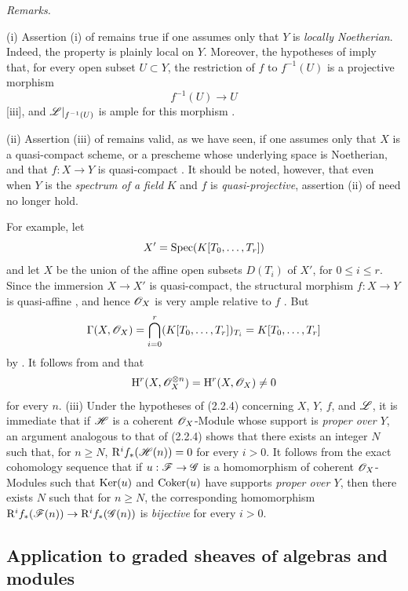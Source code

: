 \begin{env}[2.2.5]
\label{III.2.2.5}
\emph{Remarks.}

(i) Assertion (i) of  remains true if one assumes only that $Y$ is \emph{locally Noetherian}.
Indeed, the property is plainly local on $Y$.
Moreover, the hypotheses of  imply that, for every open subset $U\subset Y$, the restriction of $f$ to $f^{-1}(U)$ is a projective morphism
\[
  f^{-1}(U)\longrightarrow U
\]
[iii], and $\mathscr{L}|_{f^{-1}(U)}$ is ample for this morphism .

(ii) Assertion (iii) of  remains valid, as we have seen, if one assumes only that $X$ is a quasi-compact scheme, or a prescheme whose underlying space is Noetherian, and that $f:X\to Y$ is quasi-compact .
It should be noted, however, that even when $Y$ is the \emph{spectrum of a field} $K$ and $f$ is \emph{quasi-projective}, assertion (ii) of  need no longer hold.

For example, let
\[
  X'=\operatorname{Spec}(K[T_0,\ldots,T_r])
\]
and let $X$ be the union of the affine open subsets $D(T_i)$ of $X'$, for $0\leq i\leq r$.
Since the immersion $X\to X'$ is quasi-compact, the structural morphism $f:X\to Y$ is quasi-affine , and hence $\mathscr{O}_X$ is very ample relative to $f$ .
But
\[
  \Gamma(X,\mathscr{O}_X)
  =\bigcap_{i=0}^r(K[T_0,\ldots,T_r])_{T_i}
  =K[T_0,\ldots,T_r]
\]
by .
It follows from  and  that
\[
  \mathrm{H}^r(X,\mathscr{O}_X^{\otimes n})
  =\mathrm{H}^r(X,\mathscr{O}_X)
  \neq0
\]
for every $n$.
(iii) Under the hypotheses of (2.2.4) concerning $X$, $Y$, $f$, and $\mathscr{L}$,
it is immediate that if $\mathscr{H}$ is a coherent $\mathscr{O}_X$-Module whose support
is \emph{proper over $Y$}, an argument analogous to that of (2.2.4) shows
that there exists an integer $N$ such that, for $n\geq N$,
$\mathrm{R}^if_*(\mathscr{H}(n))=0$ for every $i>0$. It follows from the exact
cohomology sequence that if $u:\mathscr{F}\to\mathscr{G}$ is a homomorphism of coherent
$\mathscr{O}_X$-Modules such that $\operatorname{Ker}(u)$ and $\operatorname{Coker}(u)$ have supports
\emph{proper over $Y$}, then there exists $N$ such that for $n\geq N$, the
corresponding homomorphism
$\mathrm{R}^if_*(\mathscr{F}(n))\to\mathrm{R}^if_*(\mathscr{G}(n))$ is \emph{bijective} for every
$i>0$.
\end{env}


\subsection{Application to graded sheaves of algebras and modules}
\label{subsection:III.2.3}

